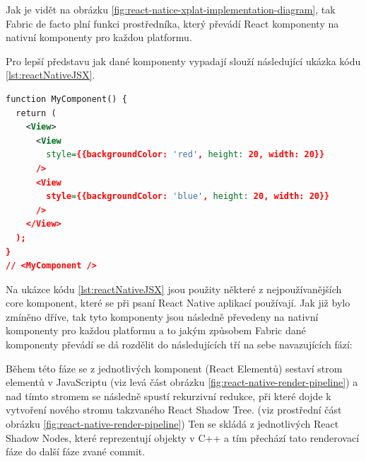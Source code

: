 



Jak je vidět na obrázku \ref{fig:react-natice-xplat-implementation-diagram}, tak Fabric de facto plní funkci prostředníka, který převádí React 
komponenty na nativní komponenty pro každou platformu. 

Pro lepší představu jak dané komponenty vypadají slouží následující ukázka kódu \ref{lst:reactNativeJSX}.

\begin{lstlisting}[caption={Popis UI komponent pomoci JSX}, label={lst:reactNativeJSX}, language=XML]
function MyComponent() {
  return (
    <View>
      <View
        style={{backgroundColor: 'red', height: 20, width: 20}}
      />
      <View
        style={{backgroundColor: 'blue', height: 20, width: 20}}
      />
    </View>
  );
}
// <MyComponent />
\end{lstlisting}

Na ukázce kódu \ref{lst:reactNativeJSX} jsou použity některé z nejpoužívanějších core komponent, které se při psaní React
Native aplikací používají. \cite{reactNativeComponents} Jak již bylo zmíněno dříve, tak tyto komponenty jsou následně převedeny 
na nativní komponenty pro každou platformu a to jakým způsobem Fabric dané komponenty převádí se dá rozdělit do následujících tří
na sebe navazujících fází: \cite{reactNativeRenderCommitMount}
 

\smallskip

Během této fáze se z jednotlivých komponent (React Elementů) sestaví strom elementů v JavaScriptu (viz levá část obrázku \ref{fig:react-native-render-pipeline}) a nad tímto stromem se 
následně spustí rekurzivní redukce, při které dojde k vytvoření nového stromu takzvaného React Shadow Tree. (viz prostřední část obrázku \ref{fig:react-native-render-pipeline})
\cite{reactNativeRenderCommitMount} Ten se skládá z jednotlivých React Shadow Nodes, které reprezentují objekty v C++ a tím přechází tato renderovací fáze do další fáze zvané commit.\cite{reactNativeRenderCommitMount}

